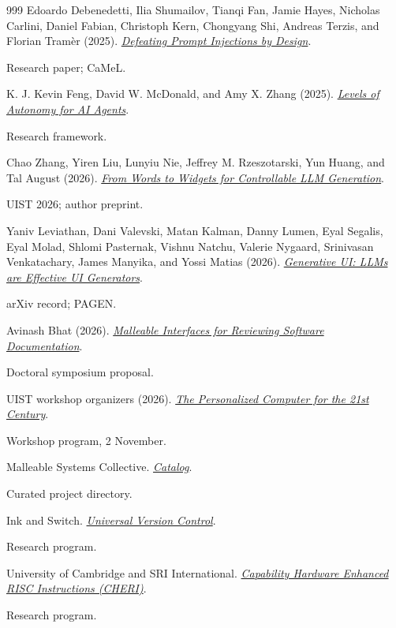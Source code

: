 \documentclass[11pt,letterpaper]{article}
\begin{document}
\begin{thebibliography}{999}
Edoardo Debenedetti, Ilia Shumailov, Tianqi Fan, Jamie Hayes, Nicholas Carlini, Daniel Fabian, Christoph Kern, Chongyang Shi, Andreas Terzis, and Florian Tramèr (2025).
\href{https://arxiv.org/abs/2503.18813}{\emph{Defeating Prompt Injections by Design}}.
\par {\small Research paper; CaMeL.}

K. J. Kevin Feng, David W. McDonald, and Amy X. Zhang (2025).
\href{https://arxiv.org/abs/2506.12469}{\emph{Levels of Autonomy for AI Agents}}.
\par {\small Research framework.}

Chao Zhang, Yiren Liu, Lunyiu Nie, Jeffrey M. Rzeszotarski, Yun Huang, and Tal August (2026).
\href{https://arxiv.org/abs/2604.10925}{\emph{From Words to Widgets for Controllable LLM Generation}}.
\par {\small UIST 2026; author preprint.}

Yaniv Leviathan, Dani Valevski, Matan Kalman, Danny Lumen, Eyal Segalis, Eyal Molad, Shlomi Pasternak, Vishnu Natchu, Valerie Nygaard, Srinivasan Venkatachary, James Manyika, and Yossi Matias (2026).
\href{https://arxiv.org/abs/2604.09577}{\emph{Generative UI: LLMs are Effective UI Generators}}.
\par {\small arXiv record; PAGEN.}

Avinash Bhat (2026).
\href{https://avinashbhat.github.io/papers/bhat_malleable_2026.pdf}{\emph{Malleable Interfaces for Reviewing Software Documentation}}.
\par {\small Doctoral symposium proposal.}

UIST workshop organizers (2026).
\href{https://personalized.computer/uist-26/}{\emph{The Personalized Computer for the 21st Century}}.
\par {\small Workshop program, 2 November.}

Malleable Systems Collective.
\href{https://malleable.systems/catalog/}{\emph{Catalog}}.
\par {\small Curated project directory.}

Ink and Switch.
\href{https://www.inkandswitch.com/universal-version-control/}{\emph{Universal Version Control}}.
\par {\small Research program.}

University of Cambridge and SRI International.
\href{https://www.cl.cam.ac.uk/research/security/ctsrd/cheri/}{\emph{Capability Hardware Enhanced RISC Instructions (CHERI)}}.
\par {\small Research program.}


\end{thebibliography}
\end{document}
